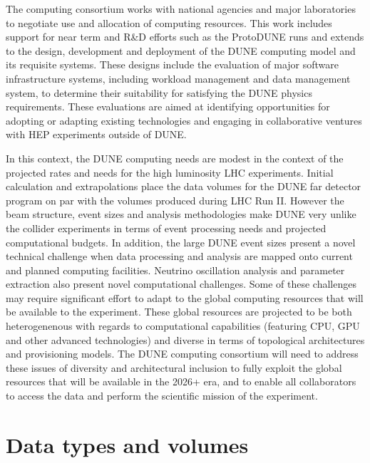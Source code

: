 The computing consortium works with national agencies and major laboratories to negotiate use and allocation of computing resources.  This work includes support for near term and R\&D efforts such as the ProtoDUNE runs and extends to the design, development and deployment of the DUNE computing model and its requisite systems.
These designs include the evaluation of major software infrastructure systems, including workload management and data management system, to determine their suitability for satisfying the DUNE physics requirements.   These evaluations are aimed at identifying opportunities for adopting or adapting existing technologies and engaging in collaborative ventures with HEP experiments outside of DUNE. 

In this context, the DUNE computing needs are modest in the context of the projected rates and needs for the high luminosity LHC experiments.  Initial calculation and extrapolations place the data volumes for the DUNE far detector program on par with the volumes produced during LHC Run II.  However the  beam structure, event sizes and analysis methodologies make DUNE very unlike the collider experiments in terms of event processing needs and projected computational budgets.  In addition, the large DUNE event sizes present a novel technical challenge when data processing and analysis are mapped onto  current and planned computing facilities.  Neutrino oscillation analysis and parameter extraction also present novel computational challenges.   Some of these challenges may require significant effort to adapt to the global computing resources that will be available to the experiment.  These global resources are projected to be both heterogenenous with regards to computational capabilities (featuring CPU, GPU and other advanced technologies) and diverse in terms of topological architectures and provisioning models.  The DUNE computing consortium will need to address these issues of diversity and architectural inclusion to fully exploit the global resources that will be available in the 2026+ era, and to enable all collaborators to access the data and perform the scientific mission of the experiment.  

\section{Data types and volumes}

